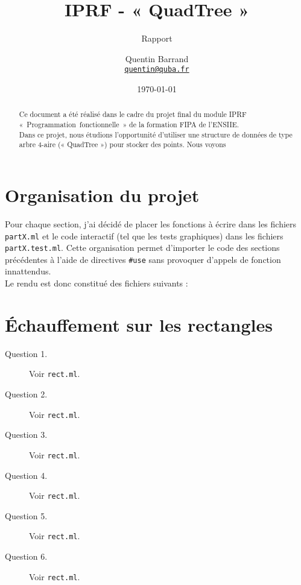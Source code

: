 \documentclass[11pt]{scrartcl}
\newcommand{\filename}[1]{\texttt{\textcolor{RawSienna}{#1}}}
\begin{document}
\title{\textbf{IPRF - « QuadTree »}}
\subtitle{Rapport}

\author{Quentin Barrand\\
		\href{mailto:quentin@quba.fr}{\texttt{quentin@quba.fr}}}
		
\date{\today}

\maketitle

\begin{abstract}
Ce document a été réalisé dans le cadre du projet final du module IPRF \mbox{« Programmation fonctionnelle »} de la formation FIPA de l'ENSIIE.\\
Dans ce projet, nous étudions l'opportunité d'utiliser une structure de données de type arbre 4-aire (« QuadTree ») pour stocker des points. Nous voyons
\end{abstract}

\break

\section*{Organisation du projet}
Pour chaque section, j'ai décidé de placer les fonctions à écrire dans les fichiers \filename{partX.ml} et le code interactif (tel que les tests graphiques) dans les fichiers \filename{partX.test.ml}. Cette organisation permet d'importer le code des sections précédentes à l'aide de directives \texttt{#use} sans provoquer d'appels de fonction innattendus.
\\
Le rendu est donc constitué des fichiers suivants :


\section{Échauffement sur les rectangles}

\begin{description}
\item[Question 1.] Voir \filename{rect.ml}.

\item[Question 2.] Voir \filename{rect.ml}.

\item[Question 3.] Voir \filename{rect.ml}.

\item[Question 4.] Voir \filename{rect.ml}.

\item[Question 5.] Voir \filename{rect.ml}.

\item[Question 6.] Voir \filename{rect.ml}.
\end{description}
\end{document}
